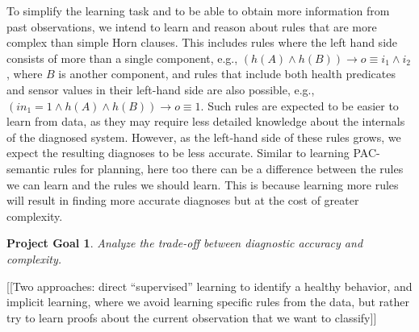 \documentclass[12pt]{article}
\newcommand{\note}[1]{\textbf{\textit{#1}}}
\newtheorem{problem}{Project Goal}
\begin{document}
To simplify the learning task and to be able to obtain more information from past observations, we intend to learn and reason about rules that are more complex than simple Horn clauses. This includes rules where the left hand side consists  of more than a single component,  e.g., $(h(A)\wedge h(B)) \rightarrow o\equiv i_1\wedge i_2$, where $B$ is another component, 
and rules that include both health predicates and sensor values in their left-hand side are also possible, e.g., 
$(in_1=1 \wedge h(A) \wedge h(B))\rightarrow o\equiv 1$. Such rules are expected to be easier to learn from data, as they may require less detailed knowledge about the internals of the diagnosed system. 
However, as the left-hand side of these rules grows, we expect the resulting diagnoses to be less accurate. 
Similar to learning PAC-semantic rules for planning, here too there can be a difference between the rules we can learn and the rules we should learn. This is because learning more rules will result in finding more accurate diagnoses but at the cost of greater complexity. 
\begin{problem}
Analyze the trade-off between diagnostic accuracy and complexity. 
\end{problem}


[[Two approaches: direct ``supervised'' learning to identify a healthy behavior, and implicit learning, where we avoid learning specific rules from the data, but rather try to learn proofs about the current observation that we want to classify]]


\end{document}
